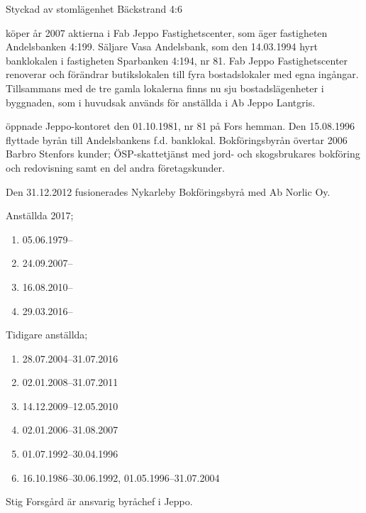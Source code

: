 Styckad av stomlägenhet Bäckstrand 4:6

 köper år 2007 aktierna i Fab Jeppo Fastighetscenter, som äger fastigheten Andelsbanken 4:199.	Säljare Vasa Andelsbank, som den 14.03.1994 hyrt banklokalen i fastigheten Sparbanken 4:194, nr 81. Fab Jeppo Fastighetscenter renoverar och förändrar butikslokalen till fyra bostadslokaler med egna ingångar. Tillsammans med de tre gamla lokalerna finns nu sju bostadslägenheter i byggnaden, som i huvudsak används för anställda i Ab Jeppo Lantgris.



 öppnade Jeppo-kontoret den 01.10.1981, nr 81 på Fors hemman. Den 15.08.1996 flyttade byrån till Andelsbankens f.d. banklokal. Bokföringsbyrån övertar 2006 Barbro Stenfors kunder; ÖSP-skattetjänst med jord- och skogsbrukares bokföring och redovisning samt en del andra företagskunder.

Den 31.12.2012 fusionerades Nykarleby Bokföringsbyrå med Ab Norlic Oy.

Anställda 2017;
\begin{enumerate}
  \item {}        05.06.1979--
  \item {}      	 24.09.2007--
  \item {}   	 16.08.2010--
  \item {}  	 29.03.2016--
\end{enumerate}

Tidigare anställda;
\begin{enumerate}
  \item {}    28.07.2004--31.07.2016
  \item {}            02.01.2008--31.07.2011
  \item {}      14.12.2009--12.05.2010
  \item {}     02.01.2006--31.08.2007
  \item {}           01.07.1992--30.04.1996
  \item {}          16.10.1986--30.06.1992, 01.05.1996--31.07.2004
\end{enumerate}
Stig Forsgård är ansvarig byråchef i Jeppo.


